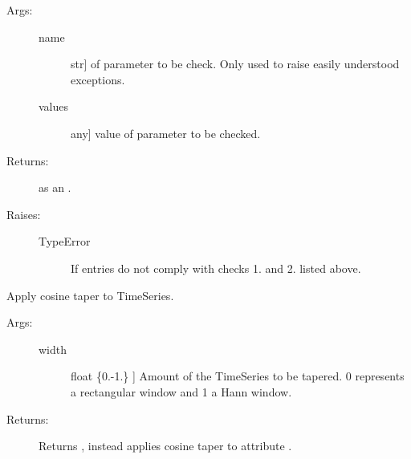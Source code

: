 \documentclass[letterpaper,10pt,english]{sphinxmanual}
\begin{document}
\begin{fulllineitems}
\begin{fulllineitems}
\begin{description}
\begin{enumerate}
\end{enumerate}

\item[{Args:}] \leavevmode\begin{description}
\item[{name}] \leavevmode{[}str{]}
 of parameter to be check. Only used to raise 
easily understood exceptions.

\item[{values}] \leavevmode{[}any{]}
value of parameter to be checked.

\end{description}

\item[{Returns:}] \leavevmode
{} as an .

\item[{Raises:}] \leavevmode\begin{description}
\item[{TypeError}] \leavevmode
If entries do not comply with checks 1. and 2. listed 
above.

\end{description}

\end{description}

\end{fulllineitems}



\begin{fulllineitems}
Apply cosine taper to TimeSeries.
\begin{description}
\item[{Args:}] \leavevmode\begin{description}
\item[{width}] \leavevmode{[}float \{0.-1.\} {]}
Amount of the TimeSeries to be tapered. 0 represents a 
rectangular window and 1 a Hann window.

\end{description}

\item[{Returns:}] \leavevmode
Returns , instead applies cosine taper to attribute
.

\end{description}

\end{fulllineitems}




\end{fulllineitems}
\end{document}
